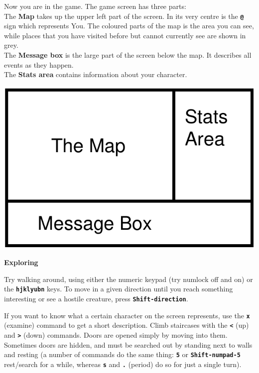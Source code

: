 \documentclass[a4paper,10pt]{article}
\newcommand{\key}[1]{{{\texttt{\textbf{#1}}}}} %
\newcommand{\sex}[1]{{{\textbf{#1}}}} %
\newcommand{\para}{\vspace{1.5ex}}
\begin{document}
\begin{minipage}{10cm}
Now you are in the game. The game screen has three parts: \\
The \textbf{Map} takes up the upper left part of the screen. In its very 
centre is the \key{@} sign which represents You. The coloured parts of the map
is the area you can see, while places that you have visited before but cannot
currently see are shown in grey. \\
The \textbf{Message box} is the large part of the screen below the map. It 
describes all events as they happen. \\
The \textbf{Stats area} contains information about your character. 
\end{minipage}
\begin{minipage}{1cm}
\phantom{xx}
\end{minipage}
\begin{minipage}{4cm}
\includegraphics[scale=0.4]{screen}
\end{minipage}
\para\para

\sex{Exploring} \para

Try walking around, using either the numeric keypad (try numlock off and on) 
or the \key{hjklyubn} keys. To move in a given direction until you reach 
something interesting or see a hostile creature, press \key{Shift-direction}. 

If you want to know what a certain character on the screen represents, use the 
\key{x} (examine) command to get a short description. Climb staircases with
the \key{<} (up) and \key{>} (down) commands. Doors are opened simply by 
moving into them. Sometimes doors are hidden, and must be searched out by 
standing next to walls and resting (a number of commands do the same thing: 
\key{5} or \key{Shift-numpad-5} rest/search for a while, whereas \key{s} and 
\key{.} (period) do so for just a single turn).
\end{document}
